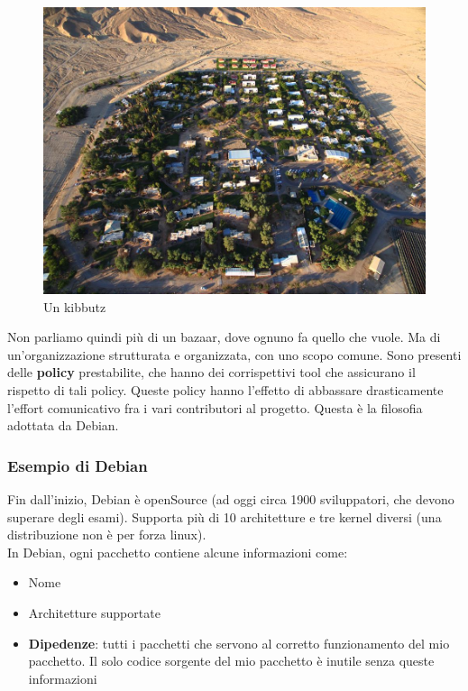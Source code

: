 \documentclass[a4paper,12pt]{article}
\begin{document}
\begin{figure}[H]
	\centering
	 \includegraphics[width=0.6\linewidth]{Immagini/kibbutz.jpg}
	 \caption{Un kibbutz}
\end{figure}

Non parliamo quindi più di un bazaar, dove ognuno fa quello che vuole. Ma di un'organizzazione strutturata e organizzata, con uno scopo comune. Sono presenti delle \textbf{policy} prestabilite, che hanno dei corrispettivi tool che assicurano il rispetto di tali policy. Queste policy hanno l'effetto di abbassare drasticamente l'effort comunicativo fra i vari contributori al progetto. Questa è la filosofia adottata da Debian.

\subsubsection{Esempio di Debian}
Fin dall'inizio, Debian è openSource (ad oggi circa 1900 sviluppatori, che devono superare degli esami). Supporta più di 10 architetture e tre kernel diversi (una distribuzione non è per forza linux).\\
In Debian, ogni pacchetto contiene alcune informazioni come:
\begin{itemize}
 \item Nome
 \item Architetture supportate
 \item \textbf{Dipedenze}: tutti i pacchetti che servono al corretto funzionamento del mio pacchetto. Il solo codice sorgente del mio pacchetto è inutile senza queste informazioni
\end{itemize}
\end{document}
